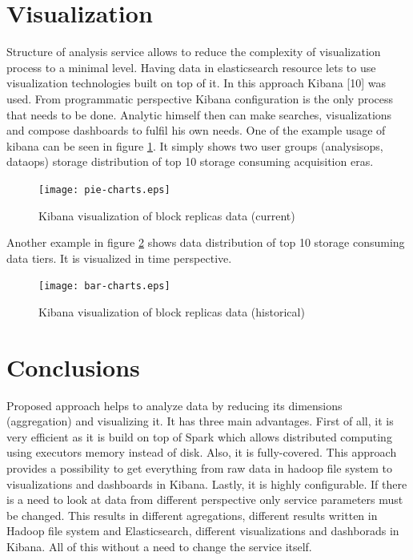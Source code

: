 \documentclass[a4paper]{jpconf}
\begin{document}
\section{Visualization}

Structure of analysis service allows to reduce the complexity of visualization process to a minimal level. Having data in elasticsearch resource lets to use visualization technologies 
built on top of it. In this approach Kibana [10] was used. From programmatic perspective Kibana configuration is the only process that needs to be done. Analytic himself then can 
make searches, visualizations and compose dashboards to fulfil his own needs. One of the example usage of kibana can be seen in figure \ref{fig:pie-charts}. It simply shows two user groups 
(analysisops, dataops) storage distribution of top 10 storage consuming acquisition eras.

\begin{figure}[h]
\begin{center}
\texttt{[image: pie-charts.eps]}\hspace{2pc}%
\caption{\label{fig:pie-charts}Kibana visualization of block replicas data (current)}
\end{center}
\end{figure}

Another example in figure \ref{fig:bar-charts} shows data distribution of top 10 storage consuming data tiers. It is visualized in time perspective. 

\begin{figure}[h]
\begin{center}
\texttt{[image: bar-charts.eps]}\hspace{2pc}%
\caption{\label{fig:bar-charts}Kibana visualization of block replicas data (historical)}
\end{center}
\end{figure}

\section{Conclusions}

Proposed approach helps to analyze data by reducing its dimensions (aggregation) and visualizing it. It has three main advantages. First of all, it is very 
efficient as it is build on top of Spark which allows distributed computing using executors memory instead of disk. Also, it is fully-covered. This approach provides a possibility to
get everything from raw data in hadoop file system to visualizations and dashboards in Kibana. Lastly, it is highly configurable. If there is a need to look at 
data from different perspective only service parameters must be changed. This results in different agregations, different results written in Hadoop file system and Elasticsearch, 
different visualizations and dashborads in Kibana. All of this without a need to change the service itself.
\end{document}
